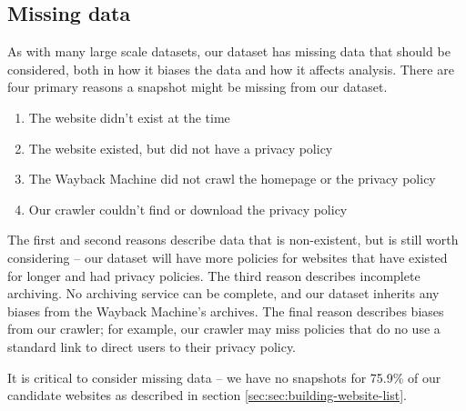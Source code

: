 \subsection{Missing data}
\label{subsec:data-gaps}

\newcommand{\absentPerc}{75.9}
\newcommand{\absentEngPerc}{47.3}
\newcommand{\absentEngOneKPerc}{23.8}
\newcommand{\gapsPerc}{82.2}
\newcommand{\pregapsPerc}{78.0}
\newcommand{\midgapsPerc}{8.0}
\newcommand{\postgapsPerc}{14.1}

\newcommand{\midgapsPossPerc}{32.0}
\newcommand{\midgapsDomainsPerc}{55.0}
\newcommand{\lifespanNoGaps}{11.2}
\newcommand{\lifespanGaps}{16.8}

\newcommand{\numpresentdoms}{130,620}
\newcommand{\numabsentenglishdoms}{150,192}



\newcommand{\midgapNoRankPerc}{4}
\newcommand{\pregapNoRankPerc}{78}
\newcommand{\postgapNoRankPerc}{10}
\newcommand{\allgapNoRankPerc}{92}
\newcommand{\notgapNoRankPerc}{8}

\newcommand{\percSnapshotWithPrior}{85.3}

As with many large scale datasets, our dataset has missing data that should be considered, both in how it biases the data and how it affects analysis. There are four primary reasons a snapshot might be missing from our dataset.
\begin{enumerate}
    \item The website didn't exist at the time
    \item The website existed, but did not have a privacy policy
    \item The Wayback Machine did not crawl the homepage or the privacy policy
    \item Our crawler couldn't find or download the privacy policy
\end{enumerate}

The first and second reasons describe data that is non-existent, but is still worth considering -- our dataset will have more policies for websites that have existed for longer and had privacy policies. The third reason describes incomplete archiving. No archiving service can be complete, and our dataset inherits any biases from the Wayback Machine's archives. The final reason describes biases from our crawler; for example, our crawler may miss policies that do no use a standard link to direct users to their privacy policy.

It is critical to consider missing data -- we have no snapshots for \absentPerc\% of our candidate websites as described in section \ref{sec:sec:building-website-list}.

